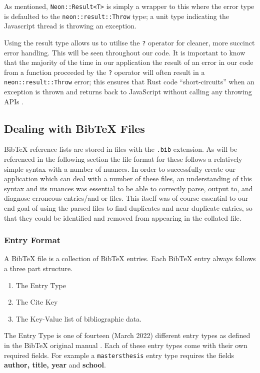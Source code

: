 \documentclass[a4paper,11pt]{article}
\newcommand{\code}[1]{\colorbox{codegray}{\texttt{#1}}}
\begin{document}
As mentioned, \code{Neon::Result<T>} is simply a wrapper to this where the error type is defaulted to the \code{neon::result::Throw} type; a unit type indicating the Javascript thread is throwing an exception.

Using the result type allows us to utilise the \code{?} operator for cleaner, more succinct error handling. This will be seen throughout our code. It is important to know that the majority of the time in our application the result of an error in our code from a function proceeded by the \code{?} operator will often result in a \code{neon::result::Throw} error; this ensures that Rust code “short-circuits” when an exception is thrown and returns back to JavaScript without calling any throwing APIs \citep{rustNeonDocs}.

\subsection{Dealing with BibTeX Files}
BibTeX reference lists are stored in files with the \code{.bib} extension. As will be referenced in the following section the file format for these follows a relatively simple syntax with a number of nuances. In order to successfully create our application which can deal with a number of these files, an understanding of this syntax and its nuances was essential to be able to correctly parse, output to, and diagnose erroneous entries/and or files. This itself was of course essential to our end goal of using the parsed files to find duplicates and near duplicate entries, so that they could be identified and removed from appearing in the collated file.

\subsubsection{Entry Format}
A BibTeX file is a collection of BibTeX entries. Each BibTeX entry always follows a three part structure.
\begin{enumerate}
    \item The Entry Type
    \item The Cite Key
    \item The Key-Value list of bibliographic data.
\end{enumerate}

The Entry Type is one of fourteen (March 2022) different entry types as defined in the BibTeX original manual \cite{bibtexOfficialDocumentation}. Each of these entry types come with their own required fields. For example a \code{mastersthesis} entry type requires the fields \textbf{author, title, year} and \textbf{school}.
\end{document}
